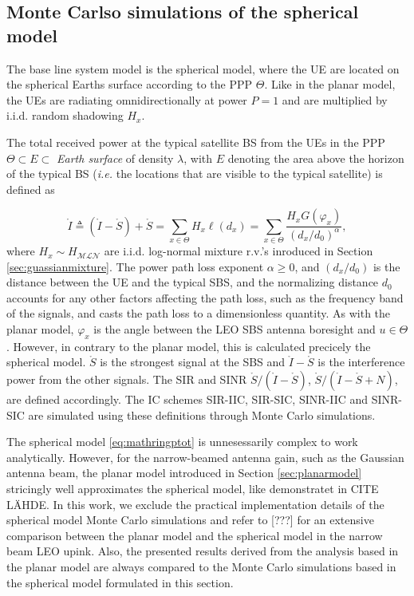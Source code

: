 \documentclass[lettersize,journal]{IEEEtran}
\begin{document}
\subsection{Monte Carlso simulations of the spherical model}
\label{sec:sphericalmodel}
The base line system model is the spherical model, where the UE are located on the spherical Earths surface according to the PPP $\Theta$. Like in the planar model, the UEs are radiating omnidirectionally at power $P=1$ and are multiplied by i.i.d. random shadowing $H_x$.

The total received power at the typical satellite BS from the UEs in the PPP $\Theta \subset E \subset$ \textit{Earth surface} of density $\lambda$, with $E$ denoting the area above the horizon of the typical BS (\textit{i.e.} the locations that are visible to the typical satellite) is defined as

\begin{equation}
  \label{eq:mathringptot}
  \mathring{I} \triangleq (\mathring{I}- \mathring{S}) + \mathring{S} =    \sum_{x \in \Theta} H_x\ell(d_x) = \sum_{x \in \Theta}  \frac{H_x G(\varphi_x)}{(d_x/d_0)^{\alpha}},
\end{equation}
where $H_{x} \sim H_{\mathcal{M}\mathcal{L}\mathcal{N}}$ are i.i.d. log-normal mixture r.v.'s inroduced in Section \ref{sec:guassianmixture}. The power path loss exponent $\alpha \geq 0$, and $(d_x/d_0)$ is the distance between the UE and the typical SBS, and the normalizing distance $d_0$ accounts for any other factors affecting the path loss, such as the frequency band of the signals, and casts the path loss to a dimensionless quantity.  As with the planar model, $\varphi_x$ is the angle between the LEO SBS antenna boresight and  $u \in \Theta$. However, in contrary to the planar model, this is calculated precicely the spherical model. $\mathring{S}$ is the strongest signal at the SBS and $\mathring{I}-\mathring{S}$ is the interference power from the other signals. The SIR and SINR $\mathring{S}/(\mathring{I}-\mathring{S})$,  $\mathring{S}/(\mathring{I}-\mathring{S}+N)$, are defined accordingly. The IC schemes SIR-IIC, SIR-SIC, SINR-IIC and SINR-SIC are simulated using these definitions through Monte Carlo simulations. 


The spherical model \eqref{eq:mathringptot} is unnesessarily complex to work analytically. However, for the narrow-beamed antenna gain, such as the Gaussian antenna beam, the planar model introduced in Section \ref{sec:planarmodel} stricingly well approximates the spherical model, like demonstratet in CITE LÄHDE. In this work, we exclude the practical implementation details of the spherical model Monte Carlo simulations and refer to [???] for an extensive comparison between the planar model and the spherical model in the narrow beam LEO upink. Also, the presented results derived from the analysis based in the planar model are always compared to the Monte Carlo simulations based in the spherical model formulated in this section.
\end{document}

